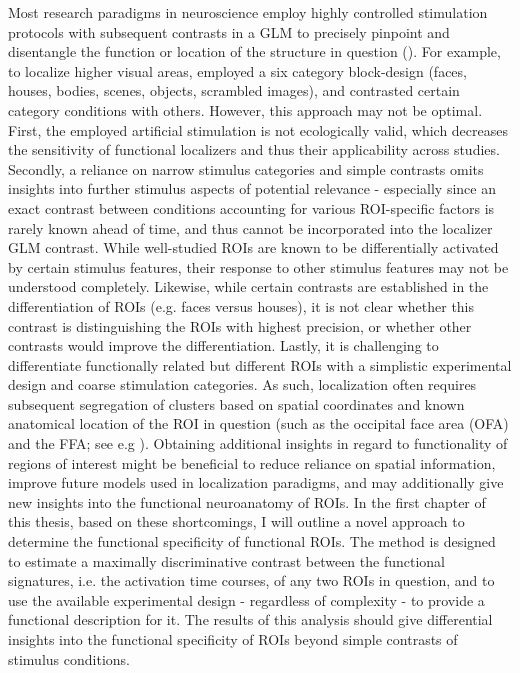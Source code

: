 \documentclass[a4paper, 12pt]{scrreprt}
\begin{document}
Most research paradigms in neuroscience employ highly controlled stimulation protocols with subsequent contrasts in a GLM to precisely pinpoint and disentangle the function or location of the structure in question (\cite{Kanwisher11163}). For example, to localize higher visual areas, \textcite{sengupta2016studyforrest} employed a six category block-design (faces, houses, bodies, scenes, objects, scrambled images), and contrasted certain category conditions with others. However, this approach may not be optimal. 
First, the employed artificial stimulation is not ecologically valid, which decreases the sensitivity of functional localizers and thus their applicability across studies. Secondly, a reliance on narrow stimulus categories and simple contrasts omits insights into further stimulus aspects of potential relevance - especially since an exact contrast between conditions accounting for various ROI-specific factors is rarely known ahead of time, and thus cannot be incorporated into the localizer GLM contrast. While well-studied ROIs are known to be differentially activated by certain stimulus features, their response to other stimulus features may not be understood completely. Likewise, while certain contrasts are established in the differentiation of ROIs (e.g. faces versus houses), it is not clear whether this contrast is distinguishing the ROIs with highest precision, or whether other contrasts would improve the differentiation. Lastly, it is challenging to differentiate functionally related but different ROIs with a simplistic experimental design and coarse stimulation categories. As such, localization often requires subsequent segregation of clusters based on spatial coordinates and known anatomical location of the ROI in question (such as the occipital face area (OFA) and the FFA; see e.g \cite{sengupta2016studyforrest}).
Obtaining additional insights in regard to functionality of regions of interest might be beneficial to reduce reliance on spatial information, improve future models used in localization paradigms, and may additionally give new insights into the functional neuroanatomy of ROIs.\newline
In the first chapter of this thesis, based on these shortcomings, I will outline a novel approach to determine the functional specificity of functional ROIs. The method is designed to estimate a maximally discriminative contrast between the functional signatures, i.e. the activation time courses, of any two ROIs in question, and to use the available experimental design - regardless of complexity - to provide a functional description for it. The results of this analysis should give differential insights into the functional specificity of ROIs beyond simple contrasts of stimulus conditions. \newline
\end{document}
